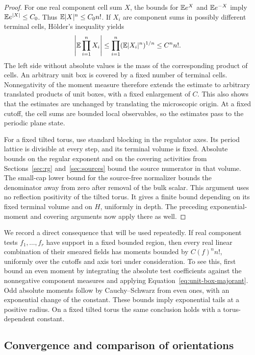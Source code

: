 \begin{proof}
For one real component cell sum $X$, the bounds for $\mathbb E e^X$ and
$\mathbb E e^{-X}$ imply $\mathbb E e^{|X|}\le C_0$.  Thus
$\mathbb E|X|^n\le C_0n!$.  If $X_i$ are component sums in possibly different
terminal cells, H\"older's inequality yields
\[
  \left|\mathbb E\prod_{i=1}^n X_i\right|
      \le\prod_{i=1}^n(\mathbb E|X_i|^n)^{1/n}
      \le C^n n!.
\]
The left side without absolute values is the mass of the corresponding
product of cells.  An arbitrary unit box is covered by a fixed number
of terminal cells.  Nonnegativity of the moment measure therefore
extends the estimate to arbitrary translated products of unit boxes,
with a fixed enlargement of $C$.  This also shows that the estimates
are unchanged by translating the microscopic origin.  At a fixed
cutoff, the cell sums are bounded local observables, so the estimates
pass to the periodic plane state.

For a fixed tilted torus, use standard blocking in the regulator axes.
Its period lattice is divisible at every step, and its terminal volume
is fixed.  Absolute bounds on the regular exponent and on the covering
activities from Sections~\ref{sec:rg} and~\ref{sec:sources} bound the
source numerator in that volume.  The small-cap lower bound for the
source-free normalizer bounds the denominator away from zero after
removal of the bulk scalar.  This argument uses no reflection
positivity of the tilted torus.  It gives a finite bound depending on
its fixed terminal volume and on $H$, uniformly in depth.  The preceding
exponential-moment and covering arguments now apply there as well.
\end{proof}

We record a direct consequence that will be used repeatedly.  If real
component tests $f_1,\ldots,f_r$ have support in a fixed bounded region,
then every real linear combination of their smeared fields has moments
bounded by $C(f)^n n!$, uniformly over the cutoffs and axis tori under
consideration.  To see this, first bound an even moment by integrating
the absolute test coefficients against the nonnegative component
measures and applying Equation~\eqref{eq:unit-box-majorant}.  Odd
absolute moments follow by Cauchy--Schwarz from even ones, with an
exponential change of the constant.  These bounds imply exponential
tails at a positive radius.  On a fixed tilted torus the same conclusion
holds with a torus-dependent constant.

\subsection{Convergence and comparison of orientations}

